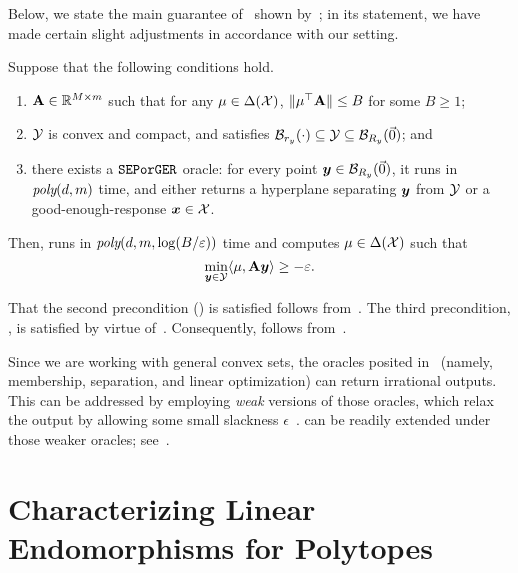 Below, we state the main guarantee of~ shown by~\citet{Daskalakis24:Efficient}; in its statement, we have made certain slight adjustments in accordance with our setting.

\begin{theorem}
    \label{th:eahrelax}
    Suppose that the following conditions hold.
    \begin{enumerate}
        \item $\mathbf{A} \in \mathbb R^{M \times m}$ such that for any $\mu \in \Delta({\mathcal{X}})$, $\| \mu^\top \mathbf{A} \| \leq B$ for some $B \geq 1$;
        \item ${\mathcal{Y}}$ is convex and compact, and satisfies ${\mathcal{B}}_{r_y}(\cdot) \subseteq {\mathcal{Y}} \subseteq {\mathcal{B}}_{R_y}(\vec{0})$; \label{item:niceness-Y} and
        \item there exists a $\mathtt{SEPorGER}$ oracle: for every point ${\bm{y}} \in {\mathcal{B}}_{R_y}(\vec{0})$, it runs in $\textit{poly}(d, m)$ time, and either returns a hyperplane separating ${\bm{y}}$ from ${\mathcal{Y}}$ or a good-enough-response ${\bm{x}} \in {\mathcal{X}}$.\label{item:oracle}
    \end{enumerate}
    Then,  runs in $\textit{poly}(d, m, \log(B/\varepsilon))$ time and computes $\mu \in \Delta({\mathcal{X}})$ such that
    \begin{equation*}
        \min_{{\bm{y}} \in {\mathcal{Y}}} \langle \mu, \mathbf{A} {\bm{y}} \rangle \geq - \varepsilon.
    \end{equation*}
\end{theorem}

That the second precondition () is satisfied follows from~\citet[Lemma 2.3]{Daskalakis24:Efficient}. The third precondition, , is satisfied by virtue of~. Consequently,  follows from~.

\begin{remark}
    Since we are working with general convex sets, the oracles posited in~ (namely, membership, separation, and linear optimization) can return irrational outputs. This can be addressed by employing \emph{weak} versions of those oracles, which relax the output by allowing some small slackness $\epsilon$~\citep{Grotschel93:Geometric}.  can be readily extended under those weaker oracles; see~\citet[Appendices E and F]{Daskalakis24:Efficient}.
\end{remark}

\section{Characterizing Linear Endomorphisms for Polytopes}
\label{sec:repre}

